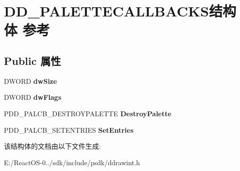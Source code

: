 \hypertarget{struct_d_d___p_a_l_e_t_t_e_c_a_l_l_b_a_c_k_s}{}\section{D\+D\+\_\+\+P\+A\+L\+E\+T\+T\+E\+C\+A\+L\+L\+B\+A\+C\+K\+S结构体 参考}
\label{struct_d_d___p_a_l_e_t_t_e_c_a_l_l_b_a_c_k_s}
\subsection*{Public 属性}
\begin{DoxyCompactItemize}
\item 
\mbox{\label{struct_d_d___p_a_l_e_t_t_e_c_a_l_l_b_a_c_k_s_af8a78a51dfcb5bb10f5dd88ad2bbf57c}} 
D\+W\+O\+RD {\bfseries dw\+Size}
\item 
\mbox{\label{struct_d_d___p_a_l_e_t_t_e_c_a_l_l_b_a_c_k_s_a56dc8305d87c9f5786b141f1023669a3}} 
D\+W\+O\+RD {\bfseries dw\+Flags}
\item 
\mbox{\label{struct_d_d___p_a_l_e_t_t_e_c_a_l_l_b_a_c_k_s_a04b49dc8163b3399991fce0087cae315}} 
P\+D\+D\+\_\+\+P\+A\+L\+C\+B\+\_\+\+D\+E\+S\+T\+R\+O\+Y\+P\+A\+L\+E\+T\+TE {\bfseries Destroy\+Palette}
\item 
\mbox{\label{struct_d_d___p_a_l_e_t_t_e_c_a_l_l_b_a_c_k_s_a86599834e0e13824010521b6e095b03a}} 
P\+D\+D\+\_\+\+P\+A\+L\+C\+B\+\_\+\+S\+E\+T\+E\+N\+T\+R\+I\+ES {\bfseries Set\+Entries}
\end{DoxyCompactItemize}


该结构体的文档由以下文件生成\+:\begin{DoxyCompactItemize}
\item 
E\+:/\+React\+O\+S-\/0../sdk/include/psdk/ddrawint.\+h\end{DoxyCompactItemize}
